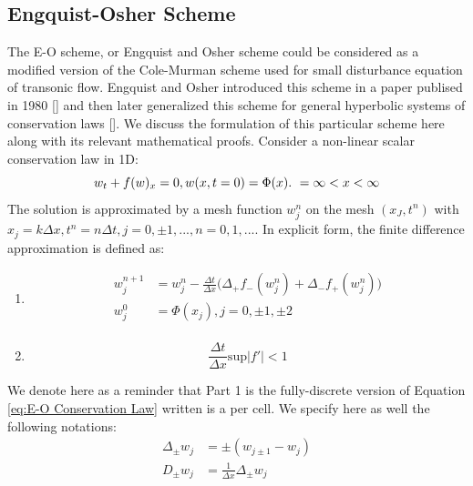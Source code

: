 \documentclass[a4paper]{article}
\numberwithin{equation}{section}
\begin{document}
\subsection{Engquist-Osher Scheme}
The E-O scheme, or Engquist and Osher scheme could be considered as a modified version of the Cole-Murman scheme used for small disturbance equation of transonic flow.  Engquist and Osher introduced this scheme in a paper publised in 1980 [] and then later generalized this scheme for general hyperbolic systems of conservation laws []. We discuss the formulation of this particular scheme here along with its relevant mathematical proofs.
Consider a non-linear scalar conservation law in 1D:
\begin{equation} 
    w_t + f(w)_x = 0,\\ w(x,t=0) = \Phi(x). \ =\infty < x< \infty
\end{equation}
The solution is approximated by a mesh function $w_j^n$ on the mesh ${(x_J,t^n)}$ with $x_j = k \Delta x, t^n = n \Delta t, j = 0, \pm 1,...,n=0,1,...$. In explicit form, the finite difference approximation is defined as:
\begin{enumerate}
    \item 
\begin{equation} \label{eq:E-O Conservation Law}
    \begin{split}
        w_j^{n+1} &= w_j^n - \frac{\Delta t}{\Delta x}\big(\Delta_{+} f_{-} (w_j^n) + \Delta_{-} f_{+} (w_j^n) \big) \\
        w_j^0 &= \Phi(x_j), j = 0, \pm 1, \pm 2\\
    \end{split}
\end{equation}
    \item \label{eq:E-O_CFL}
        \begin{equation}
            \frac{\Delta t}{\Delta x} \text{sup} |f'| < 1
        \end{equation}

\end{enumerate}
We denote here as a reminder that Part 1 is the fully-discrete version of Equation \ref{eq:E-O Conservation Law} written is a per cell. We specify here as well the following notations:
\begin{equation}
    \begin{split}
        \Delta_{\pm} w_j &= \pm (w_{j\pm 1} - w_j)\\
        D_{\pm} w_j &= \frac{1}{\Delta x} \Delta_{\pm} w_j\\
    \end{split} 
\end{equation}
\end{document}

